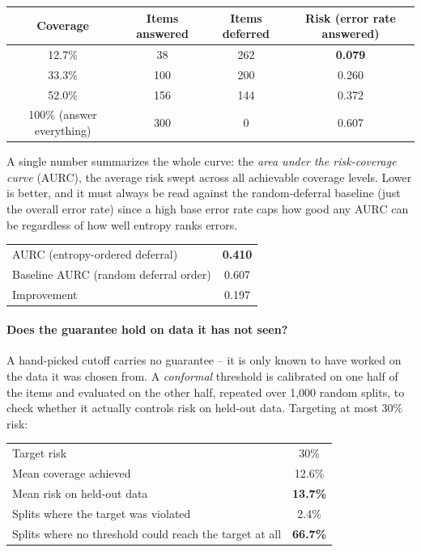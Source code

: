 \documentclass[11pt]{article}
\begin{document}
\begin{center}
\begin{tabular}{cccc}
\toprule
Coverage & Items answered & Items deferred & Risk (error rate answered) \\
\midrule
12.7\% & 38 & 262 & \textbf{0.079} \\
33.3\% & 100 & 200 & 0.260 \\
52.0\% & 156 & 144 & 0.372 \\
100\% (answer everything) & 300 & 0 & 0.607 \\
\bottomrule
\end{tabular}
\end{center}

A single number summarizes the whole curve: the \emph{area under the
risk-coverage curve} (AURC), the average risk swept across all achievable
coverage levels. Lower is better, and it must always be read against the
random-deferral baseline (just the overall error rate) since a high base
error rate caps how good any AURC can be regardless of how well entropy
ranks errors.

\begin{center}
\begin{tabular}{lc}
\toprule
AURC (entropy-ordered deferral) & \textbf{0.410} \\
Baseline AURC (random deferral order) & 0.607 \\
Improvement & 0.197 \\
\bottomrule
\end{tabular}
\end{center}

\paragraph{Does the guarantee hold on data it has not seen?} A hand-picked
cutoff carries no guarantee -- it is only known to have worked on the data
it was chosen from. A \emph{conformal} threshold is calibrated on one half
of the items and evaluated on the other half, repeated over 1{,}000 random
splits, to check whether it actually controls risk on held-out data. Targeting
at most 30\% risk:

\begin{center}
\begin{tabular}{lc}
\toprule
Target risk & 30\% \\
Mean coverage achieved & 12.6\% \\
Mean risk on held-out data & \textbf{13.7\%} \\
Splits where the target was violated & 2.4\% \\
Splits where no threshold could reach the target at all & \textbf{66.7\%} \\
\bottomrule
\end{tabular}
\end{center}
\end{document}

